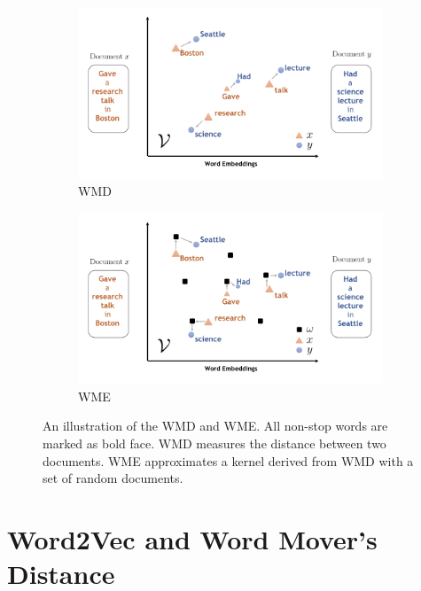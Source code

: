 \documentclass[11pt,a4paper]{article}
\newcommand{\1}{\boldsymbol{1}}
\begin{document}
\begin{figure}[htb]
\centering
	\begin{subfigure}[b]{0.45\textwidth}
      \includegraphics[width=\textwidth]{Graphs/wmd_wme_demo/WMD.png}
      \caption{WMD}
      \label{fig:wmd}
    \end{subfigure}
	\begin{subfigure}[b]{0.45\textwidth}
      \includegraphics[width=\textwidth]{Graphs/wmd_wme_demo/WME.png}
      \caption{WME}
      \label{fig:wme}
    \end{subfigure}
\vspace{0mm}
\caption{An illustration of the WMD and WME. All non-stop words are marked as bold face. WMD measures the distance between two documents. WME approximates a kernel derived from WMD with a set of random documents.}
\label{fig:wmd_wme_demo}
\end{figure}

\section{Word2Vec and Word Mover's Distance}
\label{sec:Word2Vec and WMD}
\end{document}
